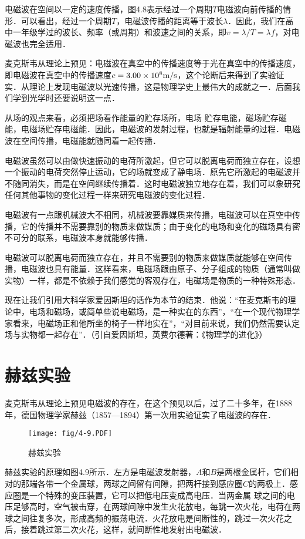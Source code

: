 电磁波在空间以一定的速度传播，图4.8表示经过一个周期$T$电磁波向前传播的情形．可以看出，经过一个周期$T$，电磁波传播的距离等于波长$\lambda$．因此，我们在高中一年级学过的波长、频率（或周期）和波速之间的关系，即$v=\lambda/T=\lambda f$，对电磁波也完全适用．

麦克斯韦从理论上预见：电磁波在真空中的传播速度等于光在真空中的传播速度，即电磁波在真空中的传播速度$c=3.00\times10^8\text{m}/\text{s}$，这个论断后来得到了实验证实．从理论上发现电磁波以光速传播，这是物理学史上最伟大的成就之一．后面我们学到光学时还要说明这一点．

从场的观点来看，必须把场看作能量的贮存场所，电场
贮存电能，磁场贮存磁能，电磁场贮存电磁能．因此，电磁波的发射过程，也就是辐射能量的过程．电磁波在空间传播，电磁能就随同着一起传播．

电磁波虽然可以由做快速振动的电荷所激起，但它可以脱离电荷而独立存在，设想一个振动的电荷突然停止运动，它的场就变成了静电场．原先它所激起的电磁波并不随同消失，而是在空间继续传播着．这时电磁波独立地存在着，我们可以象研究任何其他事物的变化过程一样来研究电磁波的变化过程．

电磁波有一点跟机械波大不相同，机械波要靠媒质来传播，电磁波可以在真空中传播，它的传播并不需要靠别的物质来做媒质；由于变化的电场和变化的磁场具有密不可分的联系，电磁波本身就能够传播．

电磁波可以脱离电荷而独立存在，并且不需要别的物质来做媒质就能够在空间传播，电磁波也具有能量．这样看来，电磁场跟由原子、分子组成的物质（通常叫做实物）一样，都是不依赖于我们感觉的客观存在，电磁场是物质的一种特殊形态．

现在让我们引用大科学家爱因斯坦的话作为本节的结束．他说：“在麦克斯韦的理论中，电场和磁场，或简单些说电磁场，是一种实在的东西”，“在一个现代物理学家看来，电磁场正和他所坐的椅子一样地实在”，“对目前来说，我们仍然需要认定场与实物都一起存在”．（引自爱因斯坦，英费尔德著：《物理学的进化》）

\section{赫兹实验}
麦克斯韦从理论上预见电磁波的存在，在这个预见以后，过了二十多年，在1888年，德国物理学家赫兹（1857—1894）第一次用实验证实了电磁波的存在．

\begin{figure}[htp]\centering
	\texttt{[image: fig/4-9.PDF]}
	\caption{赫兹实验}
	\end{figure}

赫兹实验的原理如图4.9所示．左方是电磁波发射器，$A$和$B$是两根金属杆，它们相对的那端各带一个金属球，两球之间留有间隙，把两杆接到感应圈$C$的两极上．感应圈是一个特殊的变压装置，它可以把低电压变成高电压．当两金属
球之间的电压足够高时，空气被击穿，在两球间隙中发生火花放电，每跳一次火花，电荷在两球之间往复多次，形成高频的振荡电流．火花放电是间断性的，跳过一次火花之后，接着跳过第二次火花，这样，就间断性地发射出电磁波．

